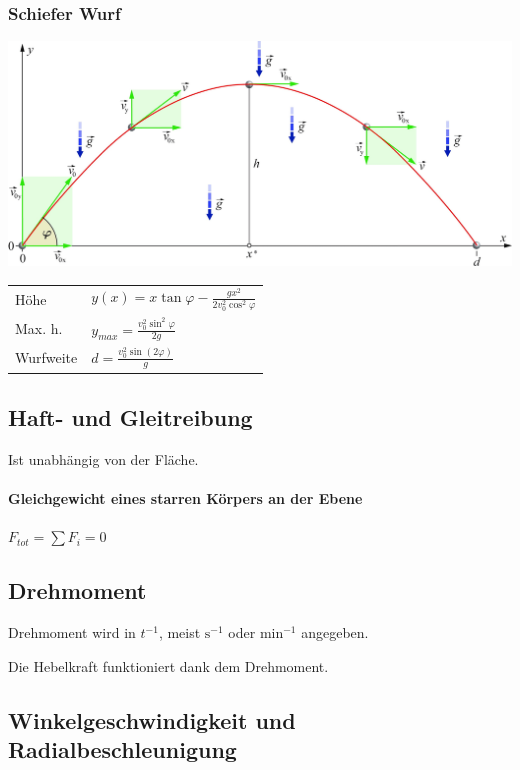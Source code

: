 \documentclass[a4paper]{scrartcl}
\begin{document}
\subsubsection{Schiefer Wurf}
	\begin{multicols}{2}
		\includegraphics[width=\linewidth]{img/wurf_schief}

		\begin{tabu} {l X}
			Höhe & $y(x) = x \tan \varphi - \frac{g x^2}{2 v^2_0 \cos^2 \varphi}$ \\
			Max. h. & $y_{max} = \frac{v^2_0 \sin^2 \varphi}{2g}$ \\
			Wurfweite & $d = \frac{v^2_0 \sin(2\varphi)}{g}$
		\end{tabu}
	\end{multicols}

\subsection{Haft- und Gleitreibung}
	Ist unabhängig von der Fläche.
	
	
	
	\paragraph{Gleichgewicht eines starren Körpers an der Ebene}
	$F_{tot} = \sum{F_i} = 0$


\subsection{Drehmoment}
	Drehmoment wird in $t^{-1}$, meist $\text{s}^{-1}$ oder $\text{min}^{-1}$ angegeben.
	
	Die Hebelkraft funktioniert dank dem Drehmoment.

\subsection{Winkelgeschwindigkeit und Radialbeschleunigung}
\end{document}
